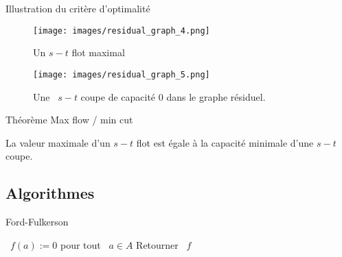 \documentclass{beamer}
\begin{document}
\begin{frame}{Illustration du critère d'optimalité} \pause
  \begin{figure}
    \begin{minipage}{0.65\linewidth}
      \texttt{[image: images/residual\_graph\_4.png]}
    \end{minipage}
    \begin{minipage}{0.3\linewidth}
      \caption{Un $s-t$ flot maximal}
    \end{minipage}
  \end{figure}
  \vfill \pause
  \begin{figure}
    \begin{minipage}{0.65\linewidth}
      \texttt{[image: images/residual\_graph\_5.png]}
    \end{minipage}
    \begin{minipage}{0.3\linewidth}
      \caption{Une ~$s-t$ coupe de capacité $0$ dans le graphe résiduel.}
    \end{minipage}
  \end{figure}
\end{frame}

\begin{frame}[t]{Théorème Max flow / min cut} \pause
  \begin{theorem}[6.5]
    La valeur maximale d'un $s-t$ flot est égale à la capacité minimale d'une $s-t$ coupe. 
  \end{theorem}
\end{frame}

\subsection{Algorithmes}

\begin{frame}[t]{Ford-Fulkerson}
  \setcounter{algocf}{4}
  \vfill
  \begin{algorithm}[H]
        \caption{Algorithme de Ford-Fulkerson}
   \SetAlgoLined 
   ~$f(a):= 0$ pour tout ~$a \in A$\; \pause
    \pause
   Retourner ~$f$
  \end{algorithm}
  \vfill 
\end{frame}

\end{document}
